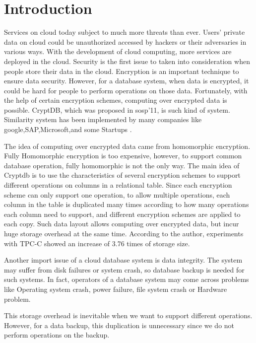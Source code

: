 \section{Introduction}

Services on cloud today subject to much more threats than ever. Users' private data on cloud could be unauthorized accessed by hackers or their adversaries in various ways.
With the development of cloud computing, more services are deployed in the cloud. Security is the first issue to taken into consideration when people store their data in the cloud. Encryption is an important technique to ensure data security. However, for a database system, when data is encrypted, it could be hard for people to perform operations on those data. Fortunately, with the help of certain encryption schemes, computing over encrypted data is possible. CryptDB\citep{popa2011cryptdb}, which was proposed in sosp'11, is such kind of system. Similarity system has been implemented by many companies like google,SAP,Microsoft,and some Startups\citep{cryptdbsite} \citep{kerschbaum2013encrypted}.


The idea of computing over encrypted data came from homomorphic encryption. Fully Homomorphic encryption is too expensive\citep{gentry2009fully}, however, to support common database operation, fully homomorphic is not the only way. The main idea of Cryptdb is to use the characteristics of several encryption schemes to support different operations on columns in a relational table.  Since each encryption scheme can only support one operation, to allow multiple operations, each column in the table is duplicated many times according to how many operations each column need to support, and different encryption schemes are applied to each copy. Such data layout allows computing over encrypted data, but incur huge storage overhead at the same time. According to the author\citep{popa2011cryptdb}, experiments with TPC-C showed an increase of 3.76 times of storage size.

Another import issue of a cloud database system is data integrity. The system may suffer from disk failures or system crash, so database backup is needed for such systems. In fact, operators of a database system may come across problems like Operating system crash, power failure, file system crash or Hardware problem\citep{mysqlbackupdocumentation}.


This storage overhead is inevitable when we want to support different operations. However, for a data backup, this duplication is unnecessary since we do not perform operations on the backup.

